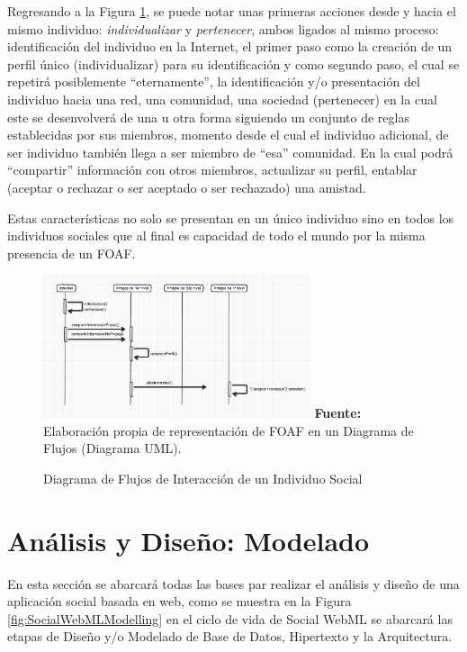 \documentclass[oneside,12pt,a4paper]{memoir}%
\begin{document}
\begin{enumerate}
	Regresando a la Figura \ref{fig:SocialFlowDiagram}, se puede notar unas
	primeras acciones desde y hacia el mismo individuo: \textit{individualizar} y
	\textit{pertenecer}, ambos ligados al mismo proceso: identificaci\'on del
	individuo en la Internet, el primer paso como la creaci\'on de un perfil \'unico
	(individualizar) para su identificaci\'on y como segundo paso, el cual se
	repetir\'a posiblemente ``eternamente'', la identificaci\'on y/o presentaci\'on
	del individuo hacia una red, una comunidad, una sociedad (pertenecer) en la
	cual este se desenvolver\'a de una u otra forma siguiendo un conjunto de reglas
	establecidas por sus miembros, momento desde el cual el individuo adicional, de
	ser individuo tambi\'en llega a ser miembro de ``esa'' comunidad. En la cual
	podr\'a ``compartir'' informaci\'on con otros miembros, actualizar su perfil,
	entablar (aceptar o rechazar o ser aceptado o ser rechazado) una amistad.
	
	Estas caracter\'isticas no solo se presentan en un \'unico individuo sino en
	todos los individuos sociales que al final es capacidad de todo el mundo por la misma
	presencia de un \ac{FOAF}.
	\end{enumerate}


	\begin{figure}[here]
		\centering
		\caption{Diagrama de Flujos de Interacci\'on de un Individuo Social}
		\includegraphics[angle=90,width=0.7\textwidth]{figure/fig_socialFlowDiagram.PNG}
			\newline
			\textbf{Fuente:} Elaboraci\'on propia de representaci\'on de \ac{FOAF} en un
			Diagrama de Flujos (Diagrama \ac{UML}).
		\label{fig:SocialFlowDiagram}	
	\end{figure}
	
	\section{An\'alisis y Dise\~no: Modelado}
	\label{sec:modelling}
	En esta secci\'on se abarcar\'a todas las bases par realizar el an\'alisis y
	dise\~no de una aplicaci\'on social basada en web, como se muestra en la Figura
	\ref{fig:SocialWebMLModelling} en el ciclo de vida de Social WebML se
	abarcar\'a las etapas de Dise\~no y/o Modelado de Base de Datos, Hipertexto y
	la Arquitectura.
	
\end{document}
